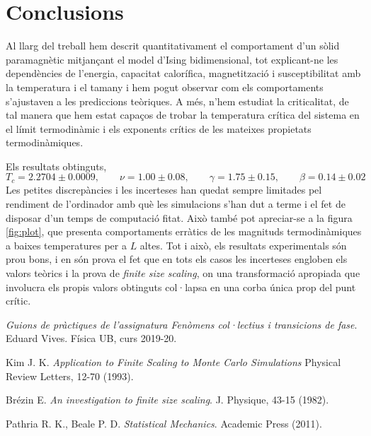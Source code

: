 \documentclass[a4paper]{article}
\begin{document}
\newpage
\section{Conclusions}
Al llarg del treball hem descrit quantitativament el comportament d'un sòlid paramagnètic mitjançant el model d'Ising bidimensional, tot explicant-ne les dependències de l'energia, capacitat calorífica, magnetització i susceptibilitat amb la temperatura i el tamany i hem pogut observar com els comportaments s'ajustaven a les prediccions teòriques. A més, n'hem estudiat la criticalitat, de tal manera que hem estat capaços de trobar la temperatura crítica del sistema en el límit termodinàmic i els exponents crítics de les mateixes propietats termodinàmiques.

Els resultats obtinguts,
\begin{equation*}
    T_c = 2.2704 \pm 0.0009, \qquad \nu = 1.00 \pm 0.08, \qquad \gamma = 1.75 \pm 0.15, \qquad \beta = 0.14 \pm 0.02
\end{equation*}
Les petites discrepàncies i les incerteses han quedat sempre limitades pel rendiment de l'ordinador amb què les simulacions s'han dut a terme i el fet de disposar d'un temps de computació fitat. Això també pot apreciar-se a la figura \ref{fig:plot}, que presenta comportaments erràtics de les magnituds termodinàmiques a baixes temperatures per a $L$ altes. Tot i això, els resultats experimentals són prou bons, i en són prova el fet que en tots els casos les incerteses engloben els valors teòrics i la prova de \textit{finite size scaling}, on una transformació apropiada que involucra els propis valors obtinguts col·lapsa en una corba única prop del punt crític.

\begin{thebibliography}{9}
\textit{Guions de pràctiques de l'assignatura Fenòmens col·lectius i transicions de fase}. Eduard Vives. Física UB, curs 2019-20.

Kim J. K. \textit{Application to Finite Scaling to Monte Carlo Simulations} Physical Review Letters, 12-70 (1993).

Brézin E. \textit{An investigation to finite size scaling}. J. Physique, 43-15 (1982).

Pathria R. K., Beale P. D. \textit{Statistical Mechanics}. Academic Press (2011).

\end{thebibliography}
\end{document}
